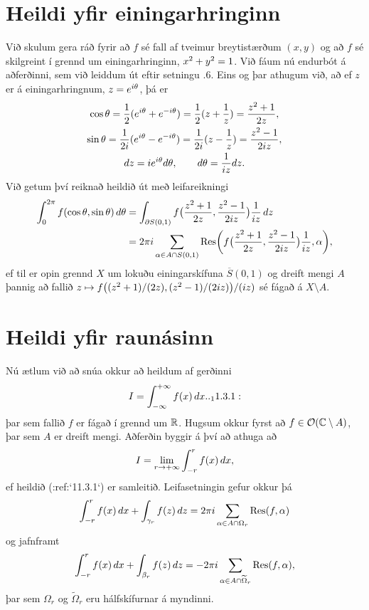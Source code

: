 \section{Heildi yfir einingarhringinn} 


\noindent
Við skulum gera ráð fyrir að $f$ sé fall af
tveimur breytistærðum $(x,y)$ og að $f$ sé skilgreint í grennd um
einingarhringinn, $x\sp 2+y\sp 2=1$.  Við fáum nú endurbót á
aðferðinni, sem við leiddum út eftir setningu .6.  Eins og þar
athugum við, að ef $z$ er á einingarhringnum, $z=e\sp{i\theta}$, þá
er 
\begin{gather*}
\cos\theta=\dfrac 12(e\sp{i\theta}+e\sp{-i\theta})
=\dfrac12(z+\dfrac 1z)=\dfrac{z\sp 2+1}{2z},\\ 
\sin\theta=\dfrac 1{2i}(e\sp{i\theta}-e\sp{-i\theta})
=\dfrac1{2i}(z-\dfrac 1z)=\dfrac{z\sp 2-1}{2iz},\\ 
dz=ie\sp{i\theta}d\theta, \qquad d\theta=\dfrac 1{iz}dz.
\end{gather*}
Við getum því reiknað  heildið út með leifareikningi
\begin{align*}
\int_0\sp {2\pi}f(\cos\theta,\sin
\theta)\, d\theta &=
\int_{\partial S(0,1)}f\big(\dfrac{z\sp 2+1}{2z},\dfrac{z\sp 2-1}{2iz}\big)
\dfrac 1{iz}\, dz\\
&=2\pi i \sum_{\alpha\in A\cap S(0,1)} {\operatorname{Res}}\bigg(
f\big(\dfrac{z\sp 2+1}{2z},\dfrac{z\sp 2-1}{2iz}\big)\dfrac 1{iz},\alpha
\bigg),
\end{align*}
ef til er opin grennd $X$ um lokuðu einingarskífuna $\overline S(0,1)$
og dreift mengi $A$ þannig að fallið $z\mapsto f\big({(z\sp
2+1)}/{(2z)},{(z\sp 2-1)}/{(2iz)}\big)/(iz)$ sé fágað á $X\setminus
A$. 



\section{Heildi yfir raunásinn}

\noindent
Nú ætlum við að snúa okkur að heildum af gerðinni
 \begin{equation*}I=\int_{-\infty}\sp{+\infty}f(x) \, dx 

.. _11.3.1:

 \end{equation*}
þar sem fallið $f$ er fágað í grennd um ${\mathbb R}$.
Hugsum okkur fyrst að $f\in {\cal O}({\mathbb C}\setminus A)$, þar sem $A$ er dreift
mengi. Aðferðin  byggir á því að athuga að 
 $$I=\lim_{r\to +\infty}\int_{-r}\sp r f(x)\, dx,
 $$
ef heildið (:ref:`11.3.1`) er samleitið.
Leifasetningin gefur okkur þá
 $$\int_{-r}\sp{r}f(x)\, dx +\int_{\gamma_r}f(z)\, dz =
2\pi i\sum_{\alpha\in A\cap \Omega_r}{\operatorname{Res}}(f,\alpha)
 $$
og jafnframt 
 $$\int_{-r}\sp{r}f(x)\, dx +\int_{\beta_r}f(z)\, dz =
-2\pi i\sum_{\alpha\in A\cap \widetilde\Omega_r}{\operatorname{Res}}(f,\alpha),
 $$
þar sem $\Omega_r$ og $\widetilde\Omega_r$ eru hálfskífurnar á
myndinni.

